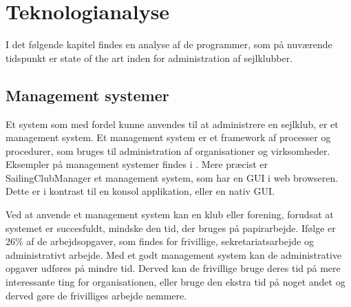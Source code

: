 \chapter{Teknologianalyse}\label{chap:teknologi-analyse}

I det følgende kapitel findes en analyse af de programmer, som på nuværende tidspunkt er state of the art inden for administration af sejlklubber.

\section{Management systemer}\label{subsec:management-systemer}

Et system som med fordel kunne anvendes til at administrere en sejlklub, er et management system. 
Et management system er et framework af processer og procedurer, som bruges til administration af organisationer og virksomheder.
Eksempler på management systemer findes i . 
Mere præcist er SailingClubManager et management system, som har en \ac{GUI} i web browseren.
Dette er i kontrast til en konsol applikation, eller en nativ \ac{GUI}. 

Ved at anvende et management system kan en klub eller forening, forudsat at systemet er succesfuldt, mindske den tid, der bruges på papirarbejde. 
Ifølge \citet{Frivilligrapporten} er 26\% af de arbejdsopgaver, som findes for frivillige, sekretariatsarbejde og administrativt arbejde. 
Med et godt management system kan de administrative opgaver udføres på mindre tid. 
Derved kan de frivillige bruge deres tid på mere interessante ting for organisationen, eller bruge den ekstra tid på noget andet og derved gøre de frivilliges arbejde nemmere.


